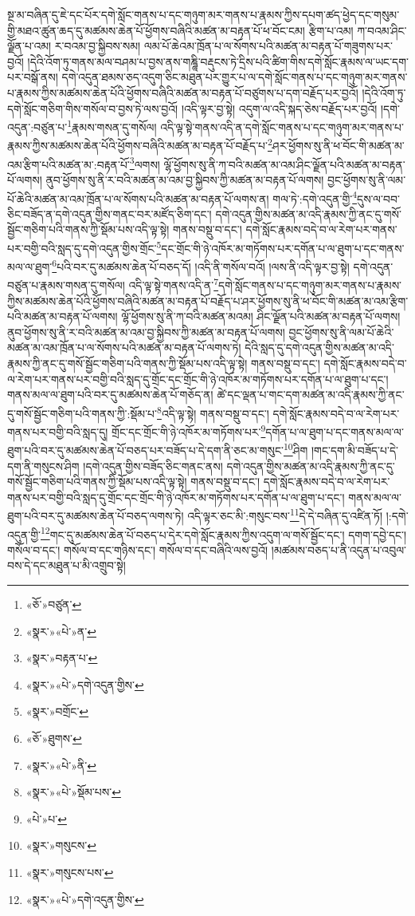 སྔ་མ་བཞིན་དུ་ཇེ་དང་པོར་དགེ་སློང་གནས་པ་དང་གཉུག་མར་གནས་པ་རྣམས་ཀྱིས་དཔག་ཚད་ཕྱེད་དང་གསུམ་གྱི་མཐའ་ཚུན་ཆད་དུ་མཚམས་ཆེན་པོ་ཕྱོགས་བཞིའི་མཚན་མ་བརྟན་པོ་ཕ་བོང་ངམ། རྩིག་པ་འམ། ཀ་བའམ་ཤིང་ལྗོན་པ་འམ། ར་བའམ་བྱ་སྐྱིབས་སམ། ལམ་པོ་ཆེའམ་ཁྲོན་པ་ལ་སོགས་པའི་མཚན་མ་བརྟན་པོ་གཟུགས་པར་བྱའོ། །དེའི་འོག་ཏུ་གནས་མལ་བཤམ་པ་བྱས་ནས་གཎྜཱི་བརྡུངས་ཏེ་དྲིས་པའི་ཚིག་གིས་དགེ་སློང་རྣམས་ལ་ཡང་དག་པར་བསྒོ་ནས། དགེ་འདུན་ཐམས་ཅད་འདུག་ཅིང་མཐུན་པར་གྱུར་པ་ལ་དགེ་སློང་གནས་པ་དང་གཉུག་མར་གནས་པ་རྣམས་ཀྱིས་མཚམས་ཆེན་པོའི་ཕྱོགས་བཞིའི་མཚན་མ་བརྟན་པོ་བཙུགས་པ་དག་བརྗོད་པར་བྱའོ། །དེའི་འོག་ཏུ་དགེ་སློང་གཅིག་གིས་གསོལ་བ་བྱས་ཏེ་ལས་བྱའོ། །འདི་ལྟར་བྱ་སྟེ། འདུག་ལ་འདི་སྐད་ཅེས་བརྗོད་པར་བྱའོ། །དགེ་འདུན་:བཙུན་པ་\footnote{«ཅོ་»བཙུན་}རྣམས་གསན་དུ་གསོལ། འདི་ལྟ་སྟེ་གནས་འདི་ན་དགེ་སློང་གནས་པ་དང་གཉུག་མར་གནས་པ་རྣམས་ཀྱིས་མཚམས་ཆེན་པོའི་ཕྱོགས་བཞིའི་མཚན་མ་བརྟན་པོ་བརྗོད་པ་\footnote{«སྣར་»«པེ་»ན་}ཤར་ཕྱོགས་སུ་ནི་ཕ་བོང་གི་མཚན་མ་འམ་རྩིག་པའི་མཚན་མ་:བརྟན་པོ་\footnote{«སྣར་»བརྟན་པ་}ལགས། ལྷོ་ཕྱོགས་སུ་ནི་ཀ་བའི་མཚན་མ་འམ་ཤིང་ལྗོན་པའི་མཚན་མ་བརྟན་པོ་ལགས། ནུབ་ཕྱོགས་སུ་ནི་ར་བའི་མཚན་མ་འམ་བྱ་སྐྱིབས་ཀྱི་མཚན་མ་བརྟན་པོ་ལགས། བྱང་ཕྱོགས་སུ་ནི་ལམ་པོ་ཆེའི་མཚན་མ་འམ་ཁྲོན་པ་ལ་སོགས་པའི་མཚན་མ་བརྟན་པོ་ལགས་ན། གལ་ཏེ་:དགེ་འདུན་གྱི་\footnote{«སྣར་»«པེ་»དགེ་འདུན་གྱིས་}དུས་ལ་བབ་ཅིང་བཟོད་ན་དགེ་འདུན་གྱིས་གནང་བར་མཛོད་ཅིག་དང་། དགེ་འདུན་གྱིས་མཚན་མ་འདི་རྣམས་ཀྱི་ནང་དུ་གསོ་སྦྱོང་གཅིག་པའི་གནས་ཀྱི་སྡོམ་པས་འདི་ལྟ་སྟེ། གནས་བསྡུ་བ་དང་། དགེ་སློང་རྣམས་བདེ་བ་ལ་རེག་པར་གནས་པར་བགྱི་བའི་སླད་དུ་དགེ་འདུན་གྱིས་གྲོང་\footnote{«སྣར་»བགྲོང་}དང་གྲོང་གི་ཉེ་འཁོར་མ་གཏོགས་པར་དགོན་པ་ལ་ཐུག་པ་དང་གནས་མལ་ལ་ཐུག་\footnote{«ཅོ་»ཐུགས་}པའི་བར་དུ་མཚམས་ཆེན་པོ་བཅད་དོ། །འདི་ནི་གསོལ་བའོ། །ལས་ནི་འདི་ལྟར་བྱ་སྟེ། དགེ་འདུན་བཙུན་པ་རྣམས་གསན་དུ་གསོལ། འདི་ལྟ་སྟེ་གནས་འདི་ན་\footnote{«སྣར་»«པེ་»ནི་}དགེ་སློང་གནས་པ་དང་གཉུག་མར་གནས་པ་རྣམས་ཀྱིས་མཚམས་ཆེན་པོའི་ཕྱོགས་བཞིའི་མཚན་མ་བརྟན་པོ་བརྗོད་པ་ཤར་ཕྱོགས་སུ་ནི་ཕ་བོང་གི་མཚན་མ་འམ་རྩིག་པའི་མཚན་མ་བརྟན་པོ་ལགས། ལྷོ་ཕྱོགས་སུ་ནི་ཀ་བའི་མཚན་མའམ། ཤིང་ལྗོན་པའི་མཚན་མ་བརྟན་པོ་ལགས། ནུབ་ཕྱོགས་སུ་ནི་ར་བའི་མཚན་མ་འམ་བྱ་སྐྱིབས་ཀྱི་མཚན་མ་བརྟན་པོ་ལགས། བྱང་ཕྱོགས་སུ་ནི་ལམ་པོ་ཆེའི་མཚན་མ་འམ་ཁྲོན་པ་ལ་སོགས་པའི་མཚན་མ་བརྟན་པོ་ལགས་ཏེ། དེའི་སླད་དུ་དགེ་འདུན་གྱིས་མཚན་མ་འདི་རྣམས་ཀྱི་ནང་དུ་གསོ་སྦྱོང་གཅིག་པའི་གནས་ཀྱི་སྡོམ་པས་འདི་ལྟ་སྟེ། གནས་བསྡུ་བ་དང་། དགེ་སློང་རྣམས་བདེ་བ་ལ་རེག་པར་གནས་པར་བགྱི་བའི་སླད་དུ་གྲོང་དང་གྲོང་གི་ཉེ་འཁོར་མ་གཏོགས་པར་དགོན་པ་ལ་ཐུག་པ་དང་། གནས་མལ་ལ་ཐུག་པའི་བར་དུ་མཚམས་ཆེན་པོ་གཅོད་ན། ཚེ་དང་ལྡན་པ་གང་དག་མཚན་མ་འདི་རྣམས་ཀྱི་ནང་དུ་གསོ་སྦྱོང་གཅིག་པའི་གནས་ཀྱི་:སྡོམ་པ་\footnote{«སྣར་»«པེ་»སྡོམ་པས་}འདི་ལྟ་སྟེ། གནས་བསྡུ་བ་དང་། དགེ་སློང་རྣམས་བདེ་བ་ལ་རེག་པར་གནས་པར་བགྱི་བའི་སླད་དུ། གྲོང་དང་གྲོང་གི་ཉེ་འཁོར་མ་གཏོགས་པར་\footnote{«པེ་»པ་}དགོན་པ་ལ་ཐུག་པ་དང་གནས་མལ་ལ་ཐུག་པའི་བར་དུ་མཚམས་ཆེན་པོ་བཅད་པར་བཟོད་པ་དེ་དག་ནི་ཅང་མ་གསུང་\footnote{«སྣར་»གསུངས་}ཤིག །གང་དག་མི་བཟོད་པ་དེ་དག་ནི་གསུངས་ཤིག །དགེ་འདུན་གྱིས་བཟོད་ཅིང་གནང་ནས། དགེ་འདུན་གྱིས་མཚན་མ་འདི་རྣམས་ཀྱི་ནང་དུ་གསོ་སྦྱོང་གཅིག་པའི་གནས་ཀྱི་སྡོམ་པས་འདི་ལྟ་སྟེ། གནས་བསྡུ་བ་དང་། དགེ་སློང་རྣམས་བདེ་བ་ལ་རེག་པར་གནས་པར་བགྱི་བའི་སླད་དུ་གྲོང་དང་གྲོང་གི་ཉེ་འཁོར་མ་གཏོགས་པར་དགོན་པ་ལ་ཐུག་པ་དང་། གནས་མལ་ལ་ཐུག་པའི་བར་དུ་མཚམས་ཆེན་པོ་བཅད་ལགས་ཏེ། འདི་ལྟར་ཅང་མི་:གསུང་བས་\footnote{«སྣར་»གསུངས་པས་}དེ་དེ་བཞིན་དུ་འཛིན་ཏོ། །:དགེ་འདུན་གྱི་\footnote{«སྣར་»«པེ་»དགེ་འདུན་གྱིས་}གང་དུ་མཚམས་ཆེན་པོ་བཅད་པ་དེར་དགེ་སློང་རྣམས་ཀྱིས་འདུག་ལ་གསོ་སྦྱོང་དང་། དགག་དབྱེ་དང་། གསོལ་བ་དང་། གསོལ་བ་དང་གཉིས་དང་། གསོལ་བ་དང་བཞིའི་ལས་བྱའོ། །མཚམས་བཅད་པ་ནི་འདུན་པ་འབུལ་བས་དེ་དང་མཐུན་པ་མི་འགྲུབ་སྟེ། 